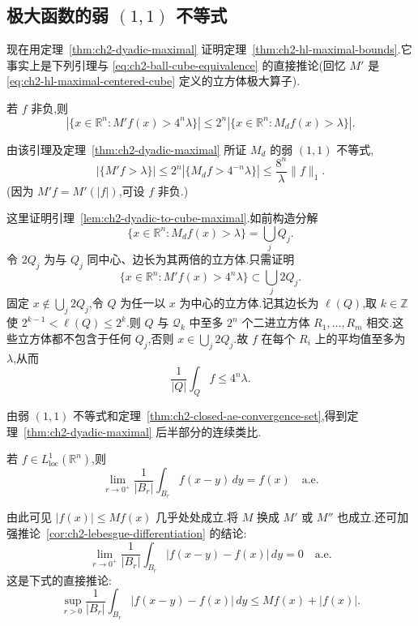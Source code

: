 \subsection{极大函数的弱 $(1,1)$ 不等式}
\label{sec:ch2-weak-11-maximal-function}

现在用定理~\ref{thm:ch2-dyadic-maximal} 证明定理~\ref{thm:ch2-hl-maximal-bounds}.它事实上是下列引理与 \eqref{eq:ch2-ball-cube-equivalence} 的直接推论(回忆 $M'$ 是 \eqref{eq:ch2-hl-maximal-centered-cube} 定义的立方体极大算子).

\begin{Lemma}
\label{lem:ch2-dyadic-to-cube-maximal}
若 $f$ 非负,则
\[
 |\{x\in\mathbb R^n:M'f(x)>4^n\lambda\}|
 \le2^n|\{x\in\mathbb R^n:M_df(x)>\lambda\}|.
\]
\end{Lemma}

由该引理及定理~\ref{thm:ch2-dyadic-maximal} 所证 $M_d$ 的弱 $(1,1)$ 不等式,
\[
 |\{M'f>\lambda\}|\le2^n|\{M_df>4^{-n}\lambda\}|
 \le\frac{8^n}{\lambda}\|f\|_1.
\]
(因为 $M'f=M'(|f|)$,可设 $f$ 非负.)

\begin{Proof}
这里证明引理~\ref{lem:ch2-dyadic-to-cube-maximal}.如前构造分解
\[
 \{x\in\mathbb R^n:M_df(x)>\lambda\}=\bigcup_jQ_j.
\]
令 $2Q_j$ 为与 $Q_j$ 同中心、边长为其两倍的立方体.只需证明
\[
 \{x\in\mathbb R^n:M'f(x)>4^n\lambda\}\subset\bigcup_j2Q_j.
\]
固定 $x\notin\bigcup_j2Q_j$,令 $Q$ 为任一以 $x$ 为中心的立方体.记其边长为 $\ell(Q)$,取 $k\in\mathbb Z$ 使 $2^{k-1}<\ell(Q)\le2^k$.则 $Q$ 与 $\mathcal Q_k$ 中至多 $2^n$ 个二进立方体 $R_1,\ldots,R_m$ 相交.这些立方体都不包含于任何 $Q_j$,否则 $x\in\bigcup_j2Q_j$.故 $f$ 在每个 $R_i$ 上的平均值至多为 $\lambda$,从而
\[
 \frac1{|Q|}\int_Qf\le4^n\lambda.
\]
\end{Proof}

\hypertarget{sample-page-048}{}
由弱 $(1,1)$ 不等式和定理~\ref{thm:ch2-closed-ae-convergence-set},得到定理~\ref{thm:ch2-dyadic-maximal} 后半部分的连续类比.

\begin{Corollary}
\label{cor:ch2-lebesgue-differentiation}
若 $f\in L^1_{\mathrm{loc}}(\mathbb R^n)$,则
\[
 \lim_{r\to0^+}\frac1{|B_r|}\int_{B_r}f(x-y)\,dy=f(x)\quad\text{a.e.}
\]
\end{Corollary}
由此可见 $|f(x)|\le Mf(x)$ 几乎处处成立.将 $M$ 换成 $M'$ 或 $M''$ 也成立.还可加强推论~\ref{cor:ch2-lebesgue-differentiation} 的结论:
\begin{equation}
\label{eq:ch2-lebesgue-point}
 \lim_{r\to0^+}\frac1{|B_r|}\int_{B_r}|f(x-y)-f(x)|\,dy=0\quad\text{a.e.}
\end{equation}
这是下式的直接推论:
\[
 \sup_{r>0}\frac1{|B_r|}\int_{B_r}|f(x-y)-f(x)|\,dy
 \le Mf(x)+|f(x)|.
\]

